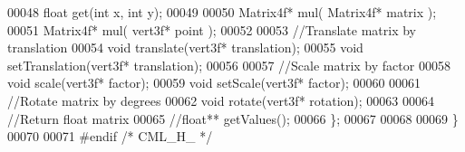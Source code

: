\begin{DoxyCode}
00048         \textcolor{keywordtype}{float} \textcolor{keyword}{get}(\textcolor{keywordtype}{int} x, \textcolor{keywordtype}{int} y);
00049 
00050         Matrix4f* mul( Matrix4f* matrix );
00051         Matrix4f* mul( vert3f*   point  );
00052 
00053         \textcolor{comment}{//Translate matrix by translation}
00054         \textcolor{keywordtype}{void} translate(vert3f* translation);
00055         \textcolor{keywordtype}{void} setTranslation(vert3f* translation);
00056 
00057         \textcolor{comment}{//Scale matrix by factor}
00058         \textcolor{keywordtype}{void} scale(vert3f* factor);
00059         \textcolor{keywordtype}{void} setScale(vert3f* factor);
00060 
00061         \textcolor{comment}{//Rotate matrix by degrees}
00062         \textcolor{keywordtype}{void} rotate(vert3f* rotation);
00063 
00064         \textcolor{comment}{//Return float matrix}
00065         \textcolor{comment}{//float** getValues();}
00066     \};
00067 
00068 
00069 \}
00070 
00071 \textcolor{preprocessor}{#endif }\textcolor{comment}{/* CML\_H\_ */}\textcolor{preprocessor}{}
\end{DoxyCode}

